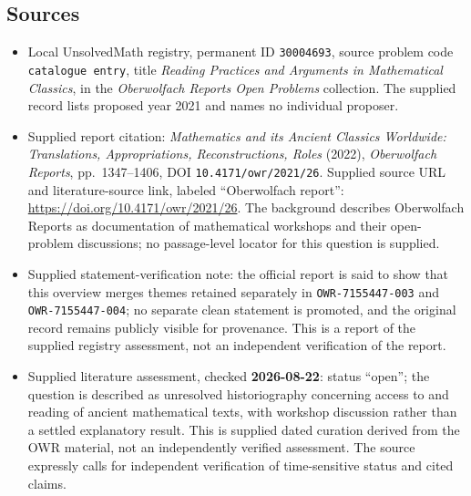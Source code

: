 \documentclass[11pt]{article}
\begin{document}
\subsection{Sources}
\begin{itemize}
\item Local UnsolvedMath registry, permanent ID \texttt{30004693}, source problem code \texttt{catalogue entry}, title \emph{Reading Practices and Arguments in Mathematical Classics}, in the \emph{Oberwolfach Reports Open Problems} collection. The supplied record lists proposed year 2021 and names no individual proposer.
\item Supplied report citation: \emph{Mathematics and its Ancient Classics Worldwide: Translations, Appropriations, Reconstructions, Roles} (2022), \emph{Oberwolfach Reports}, pp.\ 1347--1406, DOI \texttt{10.4171/owr/2021/26}. Supplied source URL and literature-source link, labeled ``Oberwolfach report'': \url{https://doi.org/10.4171/owr/2021/26}. The background describes Oberwolfach Reports as documentation of mathematical workshops and their open-problem discussions; no passage-level locator for this question is supplied.
\item Supplied statement-verification note: the official report is said to show that this overview merges themes retained separately in \texttt{OWR-7155447-003} and \texttt{OWR-7155447-004}; no separate clean statement is promoted, and the original record remains publicly visible for provenance. This is a report of the supplied registry assessment, not an independent verification of the report.
\item Supplied literature assessment, checked \textbf{2026-08-22}: status ``open''; the question is described as unresolved historiography concerning access to and reading of ancient mathematical texts, with workshop discussion rather than a settled explanatory result. This is supplied dated curation derived from the OWR material, not an independently verified assessment. The source expressly calls for independent verification of time-sensitive status and cited claims.
\end{itemize}
\end{document}
